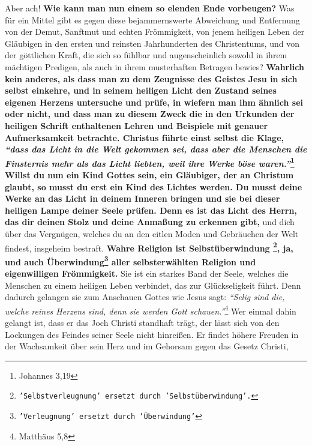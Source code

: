 Aber ach! \textbf{Wie kann man nun einem so elenden Ende vorbeugen?} Was für ein
Mittel
gibt es gegen diese bejammernswerte Abweichung und Entfernung von der Demut,
Sanftmut und echten Frömmigkeit, von jenem heiligen Leben der Gläubigen in den
ersten und reinsten Jahrhunderten des Christentums, und von der göttlichen
Kraft, die sich so fühlbar und augenscheinlich sowohl in ihrem mächtigen
Predigen, als auch in ihrem musterhaften Betragen bewies? \textbf{Wahrlich kein
anderes,
als dass man zu dem Zeugnisse des Geistes Jesu in sich
selbst einkehre, und in
seinem heiligen Licht den Zustand seines eigenen Herzens untersuche und prüfe,
in wiefern man ihm ähnlich sei oder nicht, und dass man zu diesem Zweck die in
den Urkunden der heiligen Schrift enthaltenen
Lehren und
Beispiele mit genauer
Aufmerksamkeit betrachte. Christus führte einst selbst die Klage,
\textit{"`dass das
Licht in die Welt gekommen sei, dass aber die Menschen die Finsternis mehr als
das Licht liebten, weil ihre Werke böse waren."'}\footnote{Johannes 3,19}
Willst du
nun ein Kind Gottes sein, ein Gläubiger, der an
Christum
glaubt, so musst du erst
ein Kind des Lichtes werden. Du musst deine
Werke an das
Licht in deinem Inneren
bringen und sie bei dieser heiligen Lampe deiner Seele prüfen. Denn es ist das
Licht des Herrn, das dir deinen Stolz und deine Anmaßung zu erkennen gibt,}
und
dich über das Vergnügen, welches du an den eitlen Moden und
Gebräuchen der Welt
findest, insgeheim bestraft.
\label{ref:12_11_eitle_menschen_erloesung}
\textbf{Wahre Religion ist Selbstüberwindung
\footnote{\texttt{'Selbstverleugnung' ersetzt durch 'Selbstüberwindung'.}}, ja,
und auch Überwindung\footnote{\texttt{'Verleugnung' ersetzt durch
'Überwindung'}}
aller selbsterwählten Religion und eigenwilligen
Frömmigkeit.} Sie
ist ein starkes Band der Seele, welches die Menschen zu einem heiligen Leben
verbindet, das zur Glückseligkeit führt. Denn dadurch
gelangen sie zum Anschauen
Gottes wie Jesus sagt:
\textit{"`Selig sind die, welche reines Herzens sind, denn sie
werden Gott schauen."'}\footnote{Matthäus 5,8}
Wer einmal dahin gelangt ist, dass
er das Joch Christi standhaft trägt, der lässt sich von den Lockungen des
Feindes
seiner Seele nicht hinreißen. Er findet höhere Freuden in der Wachsamkeit über
sein Herz und im Gehorsam gegen das Gesetz Christi,
